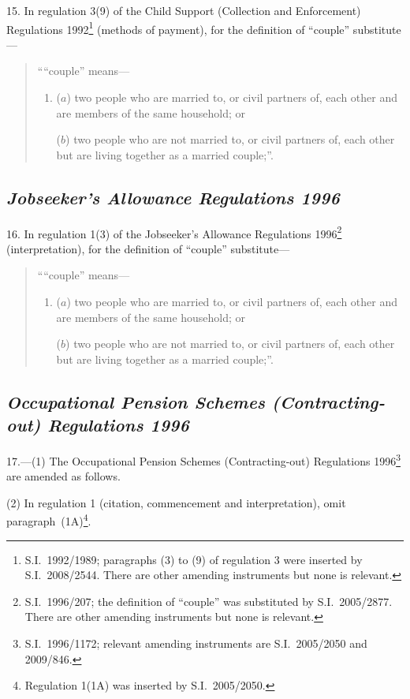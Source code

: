 \documentclass[12pt,a4paper]{article}
\begin{document}
15.  In regulation 3(9) of the Child Support (Collection and Enforcement) Regulations 1992\footnote{S.I.~1992/1989; paragraphs (3) to (9) of regulation 3 were inserted by S.I.~2008/2544. There are other amending instruments but none is relevant.} (methods of payment), for the definition of “couple” substitute—
\begin{quotation}
““couple” means—
\begin{enumerate}\item[]
($a$) 
two people who are married to, or civil partners of, each other and are members of the same household; or

($b$) 
two people who are not married to, or civil partners of, each other but are living together as a married couple;”.
\end{enumerate}
\end{quotation}

\subsection*{\itshape Jobseeker’s Allowance Regulations 1996}

16.  In regulation 1(3) of the Jobseeker’s Allowance Regulations 1996\footnote{S.I.~1996/207; the definition of “couple” was substituted by S.I.~2005/2877. There are other amending instruments but none is relevant.} (interpretation), for the definition of “couple” substitute—
\begin{quotation}
““couple” means—
\begin{enumerate}\item[]
($a$) 
two people who are married to, or civil partners of, each other and are members of the same household; or

($b$) 
two people who are not married to, or civil partners of, each other but are living together as a married couple;”.
\end{enumerate}
\end{quotation}

\subsection*{\itshape Occupational Pension Schemes (Contracting-out) Regulations 1996}

17.—(1) The Occupational Pension Schemes (Contracting-out) Regulations 1996\footnote{S.I.~1996/1172; relevant amending instruments are S.I.~2005/2050 and 2009/846.} are amended as follows.

(2) In regulation 1 (citation, commencement and interpretation), omit paragraph~(1A)\footnote{Regulation 1(1A) was inserted by S.I.~2005/2050.}.
\end{document}

